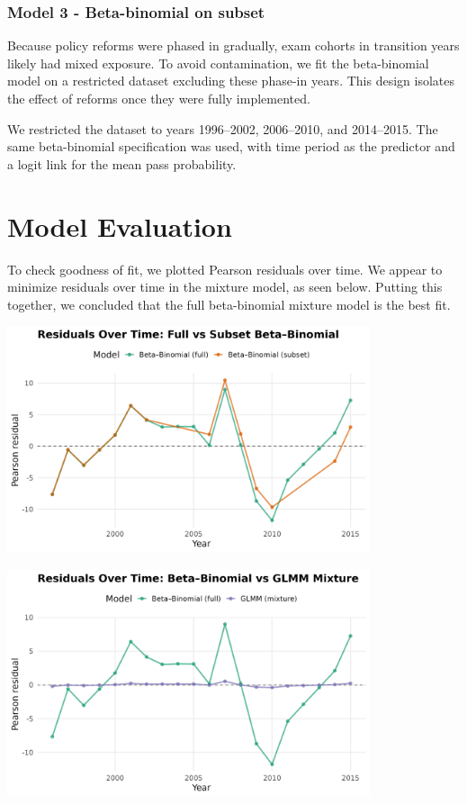 \documentclass[
  letterpaper,
  DIV=11,
  numbers=noendperiod]{scrartcl}
\begin{document}
\subsubsection{Model 3 - Beta-binomial on
subset}\label{model-3---beta-binomial-on-subset}

Because policy reforms were phased in gradually, exam cohorts in
transition years likely had mixed exposure. To avoid contamination, we
fit the beta-binomial model on a restricted dataset excluding these
phase-in years. This design isolates the effect of reforms once they
were fully implemented.

We restricted the dataset to years 1996--2002, 2006--2010, and
2014--2015. The same beta-binomial specification was used, with time
period as the predictor and a logit link for the mean pass probability.

\section{Model Evaluation}\label{model-evaluation}

To check goodness of fit, we plotted Pearson residuals over time. We
appear to minimize residuals over time in the mixture model, as seen
below. Putting this together, we concluded that the full beta-binomial
mixture model is the best fit.

\includegraphics[width=0.8\textwidth,height=\textheight]{residuals_full_vs_subset.png}

\includegraphics[width=0.8\textwidth,height=\textheight]{residuals_full_vs_mixture.png}
\end{document}
